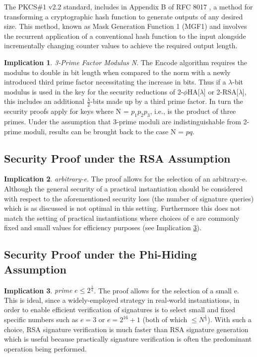\documentclass[]{final_report}
\theoremstyle{definition}
\newtheorem{implication}{Implication}
\begin{document}
The PKCS\#1 v2.2 standard, includes in Appendix B of RFC 8017 \cite{rfc8017}, a method for transforming a cryptographic hash function to generate outputs of any desired size. This method, known as Mask Generation Function 1 (MGF1) and involves the recurrent application of a conventional hash function to the input alongside incrementally changing counter values to achieve the required output length.

\begin{implication} \textit{3-Prime Factor Modulus N}.
\label{IMP:3prime}
The Encode algorithm requires the modulus to double in bit length when compared to the norm with a newly introduced third prime factor necessitating the increase in bits. Thus if a \(\lambda\)-bit modulus is used in the key for the security reductions of 2-$\phi$HA[$\lambda$] or 2-RSA[\(\lambda\)], this includes an additional \(\frac{\lambda}{2}\)-bits made up by a third prime factor. In turn the security proofs apply for keys where N = $p_1 p_2 p_3$, i.e., is the product of three primes. Under the assumption that 3-prime moduli are indistinguishable from 2-prime moduli, results can be brought back to the case N = $p q$.
\end{implication}

\subsection{Security Proof under the RSA Assumption}
\begin{implication} \textit{arbitrary-e}.
\label{IMP:RSA}
The proof allows for the selection of an arbitrary-e. Although the general security of a practical instantiation should be considered with respect to the aforementioned security loss (the number of signature queries) which is as discussed is not optimal in this setting. Furthermore this does not match the setting of practical instantiations where choices of e are commonly fixed and small values for efficiency purposes (see Implication \ref{IMP:PHI}).
\end{implication}

\subsection{Security Proof under the Phi-Hiding Assumption}
\begin{implication} \textit{prime $e \leqslant \displaystyle2^{\frac{\lambda}{4}}$}.
\label{IMP:PHI}
The proof allows for  the selection of a small e. This is ideal, since a widely-employed strategy in real-world instantiations, in order to enable efficient verification of signatures is to select small and fixed specific numbers such as $e = 3 \text{ or } e = 2^{16} + 1$ (both of which $\le N^{\frac{1}{4}}$). With such a choice, RSA signature verification is much faster than RSA signature generation which is useful because practically signature verification is often the predominant operation being performed.
\end{implication}
\end{document}
